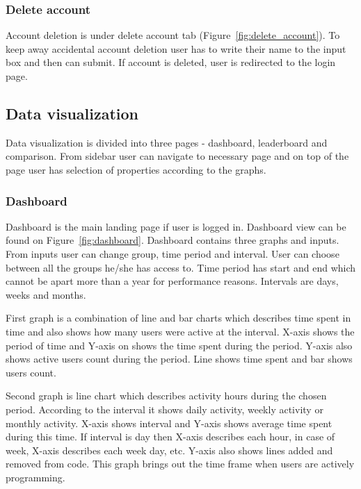 \subsubsection{Delete account}\label{subsubsec:delete-account}
Account deletion is under delete account tab (Figure~\ref{fig:delete_account}).
To keep away accidental account deletion user has to write their name to the input box and then can submit.
If account is deleted, user is redirected to the login page.

\subsection{Data visualization}\label{subsec:data-visualization}
Data visualization is divided into three pages - dashboard, leaderboard and comparison.
From sidebar user can navigate to necessary page and on top of the page user has selection of properties according to the graphs.

\subsubsection{Dashboard}\label{subsubsec:dashboard}
Dashboard is the main landing page if user is logged in.
Dashboard view can be found on Figure~\ref{fig:dashboard}.
Dashboard contains three graphs and inputs.
From inputs user can change group, time period and interval.
User can choose between all the groups he/she has access to.
Time period has start and end which cannot be apart more than a year for performance reasons.
Intervals are days, weeks and months.

First graph is a combination of line and bar charts which describes time spent in time and also shows how many users were active at the interval.
X-axis shows the period of time and Y-axis on shows the time spent during the period.
Y-axis also shows active users count during the period.
Line shows time spent and bar shows users count.

Second graph is line chart which describes activity hours during the chosen period.
According to the interval it shows daily activity, weekly activity or monthly activity.
X-axis shows interval and Y-axis shows average time spent during this time.
If interval is day then X-axis describes each hour, in case of week, X-axis describes each week day, etc.
Y-axis also shows lines added and removed from code.
This graph brings out the time frame when users are actively programming.

